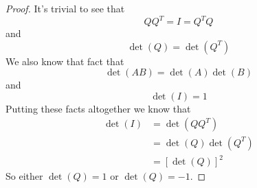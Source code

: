 \begin{homeworkProblem}

\solution

\begin{proof}
    It's trivial to see that  \[
    QQ^{T} = I = Q^{T}Q
    \] and \[
    \det(Q) = \det(Q^{T})
    \]
    We also know that fact that \[
    \det(AB) = \det(A)\det(B)
    \] and \[
    \det(I) = 1
    \]
    Putting these facts altogether we know that \[
        \begin{aligned}
    \det(I) &= \det(QQ^{T}) \\
    &= \det(Q)\det(Q^T) \\
    &= [\det(Q)]^2
    \end{aligned}
    \]
    So either $\det(Q) = 1$ or $\det(Q) = -1$.
\end{proof}
\end{homeworkProblem}
